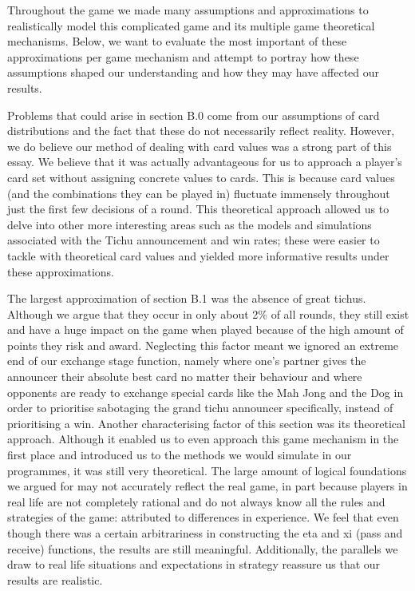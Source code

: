 Throughout the game we made many assumptions and approximations to realistically model this complicated game and its multiple game theoretical mechanisms. Below, we want to evaluate the most important of these approximations per game mechanism and attempt to portray how these assumptions shaped our understanding and how they may have affected our results.

Problems that could arise in section B.0 come from our assumptions of card distributions and the fact that these do not necessarily reflect reality. However, we do believe our method of dealing with card values was a strong part of this essay. We believe that it was actually advantageous for us to approach a player’s card set without assigning concrete values to cards. This is because card values (and the combinations they can be played in) fluctuate immensely throughout just the first few decisions of a round. This theoretical approach allowed us to delve into other more interesting areas such as the models and simulations associated with the Tichu announcement and win rates; these were easier to tackle with theoretical card values and yielded more informative results under these approximations.

The largest approximation of section B.1 was the absence of great tichus. Although we argue that they occur in only about 2$\%$ of all rounds, they still exist and have a huge impact on the game when played because of the high amount of points they risk and award. Neglecting this factor meant we ignored an extreme end of our exchange stage function, namely where one’s partner gives the announcer their absolute best card no matter their behaviour and where opponents are ready to exchange special cards like the Mah Jong and the Dog in order to prioritise sabotaging the grand tichu announcer specifically, instead of prioritising a win. Another characterising factor of this section was its theoretical approach. Although it enabled us to even approach this game mechanism in the first place and introduced us to the methods we would simulate in our programmes, it was still very theoretical. The large amount of logical foundations we argued for may not accurately reflect the real game, in part because players in real life are not completely rational and do not always know all the rules and strategies of the game: attributed to differences in experience. We feel that even though there was a certain arbitrariness in constructing the eta and xi (pass and receive) functions, the results are still meaningful. Additionally, the parallels we draw to real life situations and expectations in strategy reassure us that our results are realistic. 

